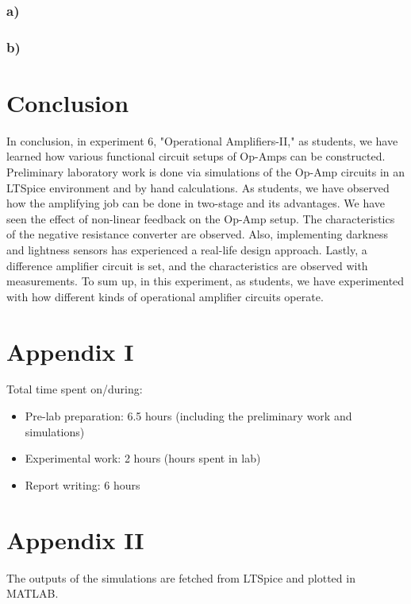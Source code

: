 \documentclass[letterpaper,12pt]{article}
\begin{document}
\subsubsection{a)}

\subsubsection{b)}

\section{Conclusion}
In conclusion, in experiment 6, "Operational Amplifiers-II," as students, we have learned how various functional circuit setups of Op-Amps can be constructed. Preliminary laboratory work is done via simulations of the Op-Amp circuits in an LTSpice environment and by hand calculations. As students, we have observed how the amplifying job can be done in two-stage and its advantages. We have seen the effect of non-linear feedback on the Op-Amp setup. The characteristics of the negative resistance converter are observed. Also, implementing darkness and lightness sensors has experienced a real-life design approach. Lastly, a difference amplifier circuit is set, and the characteristics are observed with measurements. To sum up, in this experiment, as students, we have experimented with how different kinds of operational amplifier circuits operate. 
\section*{Appendix I}
Total time spent on/during:
\begin{itemize}
	\item Pre-lab preparation: 6.5 hours (including the preliminary work and simulations) 
	\item Experimental work: 2 hours (hours spent in lab)
	\item Report writing: 6 hours 
\end{itemize}
\section*{Appendix II}
The outputs of the simulations are fetched from LTSpice and plotted in MATLAB.



\end{document}
